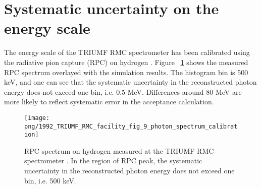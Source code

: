 \section { Systematic uncertainty on the energy scale}

The energy scale of the TRIUMF RMC spectrometer has been calibrated using the
radiative pion capture (RPC) on hydrogen \cite{RMC_1992_WRIGHT_1992_249}.
Figure ~\ref{fig:1992_photon_spectrum_calibration} shows the measured RPC spectrum
overlayed with the simulation results. The histogram bin
is 500 keV, and one can see that the systematic uncertainty in the reconstructed
photon energy does not exceed one bin, i.e. 0.5 MeV. Differences around 80 MeV are
more likely to reflect systematic error in the acceptance calculation.

\begin{figure}[htbp]
  \begin{center}
    \texttt{[image: png/1992\_TRIUMF\_RMC\_facility\_fig\_9\_photon\_spectrum\_calibration]} 
  \end{center}
  \caption{
    RPC spectrum on hydrogen measured at the TRIUMF RMC spectrometer \cite{RMC_1992_WRIGHT_1992_249}.
    In the region of RPC peak, the systematic uncertainty in the reconstructed photon energy does
    not exceed one bin, i.e. 500 keV.
  }
  \label{fig:1992_photon_spectrum_calibration}
\end{figure}

